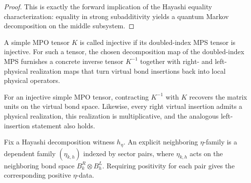 \begin{proof}
    \leanok
    This is exactly the forward implication of the Hayashi equality
    characterization: equality in strong subadditivity yields a quantum Markov
    decomposition on the middle subsystem.
\end{proof}

\begin{definition}
    \label{def:mpdo_injective_inverse_layer}
    \leanok
    A simple MPO tensor $K$ is called injective if its doubled-index MPS tensor
    is injective. For such a tensor, the chosen decomposition map of the
    doubled-index MPS furnishes a concrete inverse tensor $K^{-1}$ together
    with right- and left-physical realization maps that turn virtual bond
    insertions back into local physical operators.
\end{definition}

\begin{theorem}
    \label{thm:mpdo_injective_inverse_layer_spec}
    \leanok
    For an injective simple MPO tensor, contracting $K^{-1}$ with $K$ recovers
    the matrix units on the virtual bond space. Likewise, every right virtual
    insertion admits a physical realization, this realization is multiplicative,
    and the analogous left-insertion statement also holds.
\end{theorem}

\begin{definition}
    \label{def:mpdo_explicit_eta_operators}
    \leanok
    Fix a Hayashi decomposition witness $h_\eta$. An explicit neighboring
    $\eta$-family is a dependent family $(\eta_{k,h})$ indexed by sector pairs,
    where $\eta_{k,h}$ acts on the neighboring bond space
    $B_k^{R} \otimes B_h^{L}$. Requiring positivity for each pair gives the
    corresponding positive $\eta$-data.
\end{definition}

